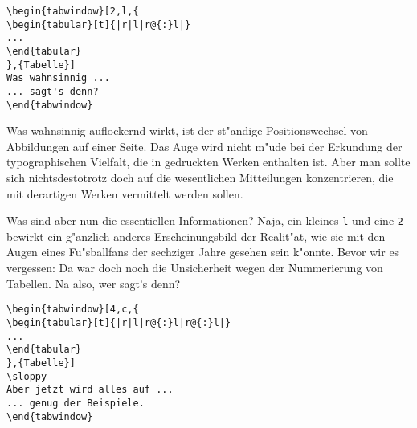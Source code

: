 \begin{verbatim}
\begin{tabwindow}[2,l,{
\begin{tabular}[t]{|r|l|r@{:}l|}
...
\end{tabular}
},{Tabelle}]
Was wahnsinnig ...
... sagt's denn?
\end{tabwindow}
\end{verbatim}

Was wahnsinnig auflockernd wirkt, ist der st"andige Positionswechsel
von Abbildungen auf einer Seite. Das Auge wird nicht m"ude bei
der Erkundung der typographischen Vielfalt, die in gedruckten
Werken enthalten ist. Aber man sollte sich nichtsdestotrotz doch
auf die wesentlichen Mitteilungen konzentrieren, die mit derartigen
Werken vermittelt werden sollen.

Was sind aber nun die essentiellen Informationen? Naja, ein kleines
{\tt l} und eine {\tt 2} bewirkt ein g"anzlich anderes Erscheinungsbild
der Realit"at, wie sie mit den Augen eines Fu"sballfans der sechziger
Jahre gesehen sein k"onnte. Bevor wir es vergessen: Da war doch noch
die Unsicherheit wegen der Nummerierung von Tabellen. Na also, wer
sagt's denn?
\end{tabwindow}

\begin{verbatim}
\begin{tabwindow}[4,c,{
\begin{tabular}[t]{|r|l|r@{:}l|r@{:}l|}
...
\end{tabular}
},{Tabelle}]
\sloppy
Aber jetzt wird alles auf ...
... genug der Beispiele.
\end{tabwindow}
\end{verbatim}

